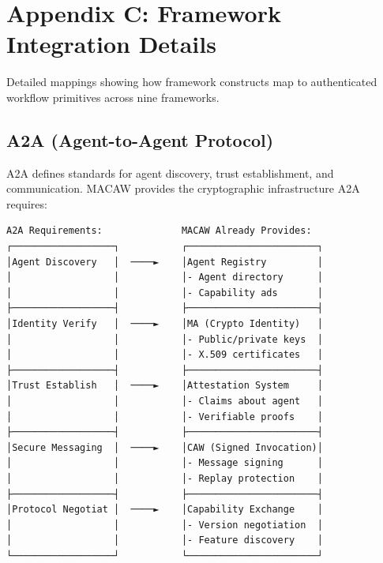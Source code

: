 \section*{Appendix C: Framework Integration Details}
\label{appendix:framework-details}

{\scriptsize
Detailed mappings showing how framework constructs map to authenticated workflow primitives across nine frameworks.

\subsection*{A2A (Agent-to-Agent Protocol)}

A2A defines standards for agent discovery, trust establishment, and communication. MACAW provides the cryptographic infrastructure A2A requires:

{\tiny
\begin{verbatim}
A2A Requirements:              MACAW Already Provides:
┌──────────────────┐           ┌───────────────────────┐
│Agent Discovery   │  ────►    │Agent Registry         │
│                  │           │- Agent directory      │
│                  │           │- Capability ads       │
├──────────────────┤           ├───────────────────────┤
│Identity Verify   │  ────►    │MA (Crypto Identity)   │
│                  │           │- Public/private keys  │
│                  │           │- X.509 certificates   │
├──────────────────┤           ├───────────────────────┤
│Trust Establish   │  ────►    │Attestation System     │
│                  │           │- Claims about agent   │
│                  │           │- Verifiable proofs    │
├──────────────────┤           ├───────────────────────┤
│Secure Messaging  │  ────►    │CAW (Signed Invocation)│
│                  │           │- Message signing      │
│                  │           │- Replay protection    │
├──────────────────┤           ├───────────────────────┤
│Protocol Negotiat │  ────►    │Capability Exchange    │
│                  │           │- Version negotiation  │
│                  │           │- Feature discovery    │
└──────────────────┘           └───────────────────────┘


\end{verbatim}}}
